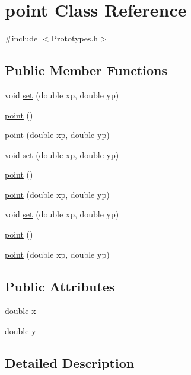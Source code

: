 \hypertarget{classpoint}{}\section{point Class Reference}
\label{classpoint}


{\ttfamily \#include $<$Prototypes.\+h$>$}

\subsection*{Public Member Functions}
\begin{DoxyCompactItemize}
\item 
void \hyperlink{classpoint_a55ff7a33caa2783f318bc5f65746e32e}{set} (double xp, double yp)
\item 
\hyperlink{classpoint_a5fe21d4a4539320bf0f5caf1218d31c8}{point} ()
\item 
\hyperlink{classpoint_a35a81eb47d874ab0ad36577aad5fc464}{point} (double xp, double yp)
\item 
void \hyperlink{classpoint_a55ff7a33caa2783f318bc5f65746e32e}{set} (double xp, double yp)
\item 
\hyperlink{classpoint_a5fe21d4a4539320bf0f5caf1218d31c8}{point} ()
\item 
\hyperlink{classpoint_a35a81eb47d874ab0ad36577aad5fc464}{point} (double xp, double yp)
\item 
void \hyperlink{classpoint_a55ff7a33caa2783f318bc5f65746e32e}{set} (double xp, double yp)
\item 
\hyperlink{classpoint_a5fe21d4a4539320bf0f5caf1218d31c8}{point} ()
\item 
\hyperlink{classpoint_a35a81eb47d874ab0ad36577aad5fc464}{point} (double xp, double yp)
\end{DoxyCompactItemize}
\subsection*{Public Attributes}
\begin{DoxyCompactItemize}
\item 
double \hyperlink{classpoint_a9c6b34deaf4900ad4193c17935fd384a}{x}
\item 
double \hyperlink{classpoint_a613f8f0d7352731638b0094e1b958b87}{y}
\end{DoxyCompactItemize}


\subsection{Detailed Description}


